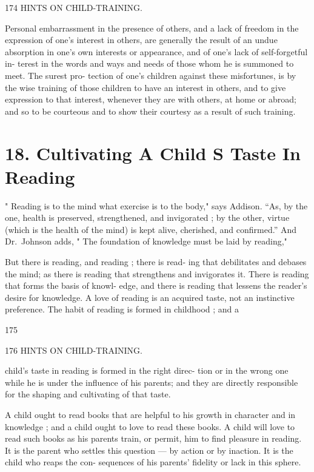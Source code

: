\documentclass[
]{book}
\begin{document}
174 HINTS ON CHILD-TRAINING.

Personal embarrassment in the presence of others, and a lack of freedom in the expression of one's interest in others, are generally the result of an undue absorption in one's own interests or appearance, and of one's lack of self-forgetful in- terest in the words and ways and needs of those whom he is summoned to meet. The surest pro- tection of one's children against these misfortunes, is by the wise training of those children to have an interest in others, and to give expression to that interest, whenever they are with others, at home or abroad; and so to be courteous and to show their courtesy as a result of such training.

\hypertarget{cultivating-a-child-s-taste-in-reading}{%
\chapter{18. Cultivating A Child S Taste In Reading}\label{cultivating-a-child-s-taste-in-reading}}

" Reading is to the mind what exercise is to the body," says Addison. ``As, by the one, health is preserved, strengthened, and invigorated ; by the other, virtue (which is the health of the mind) is kept alive, cherished, and confirmed.'' And Dr.~Johnson adds, " The foundation of knowledge must be laid by reading,"

But there is reading, and reading ; there is read- ing that debilitates and debases the mind; as there is reading that strengthens and invigorates it. There is reading that forms the basis of knowl- edge, and there is reading that lessens the reader's desire for knowledge. A love of reading is an acquired taste, not an instinctive preference. The habit of reading is formed in childhood ; and a

175

176 HINTS ON CHILD-TRAINING.

child's taste in reading is formed in the right direc- tion or in the wrong one while he is under the influence of his parents; and they are directly responsible for the shaping and cultivating of that taste.

A child ought to read books that are helpful to his growth in character and in knowledge ; and a child ought to love to read these books. A child will love to read such books as his parents train, or permit, him to find pleasure in reading. It is the parent who settles this question --- by action or by inaction. It is the child who reaps the con- sequences of his parents' fidelity or lack in this sphere.
\end{document}
